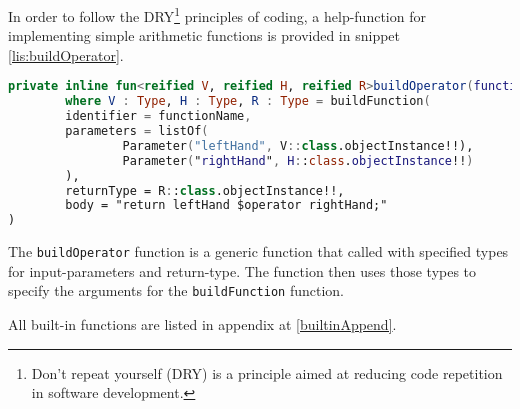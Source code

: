 In order to follow the DRY\footnote{Don't repeat yourself (DRY) is a principle aimed at reducing code repetition in software development.
} principles of coding, a help-function for implementing simple arithmetic functions is provided in snippet \ref{lis:buildOperator}.
\begin{lstlisting}[language=Kotlin,label=lis:buildOperator,caption=The implementation of buildOperator.]
private inline fun<reified V, reified H, reified R>buildOperator(functionName: String, operator: String = functionName)
        where V : Type, H : Type, R : Type = buildFunction(
        identifier = functionName,
        parameters = listOf(
                Parameter("leftHand", V::class.objectInstance!!),
                Parameter("rightHand", H::class.objectInstance!!)
        ),
        returnType = R::class.objectInstance!!,
        body = "return leftHand $operator rightHand;"
)
\end{lstlisting}
The \texttt{buildOperator} function is a generic function that called with specified types for input-parameters and return-type. 
The function then uses those types to specify the arguments for the \texttt{buildFunction} function.

All built-in functions are listed in appendix at \ref{builtinAppend}.